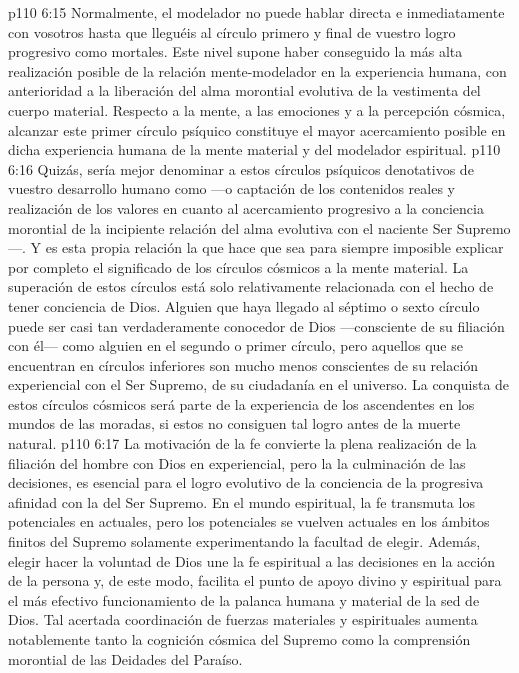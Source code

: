 \vs p110 6:15 \pc {} Normalmente, el modelador no puede hablar directa e inmediatamente con vosotros hasta que lleguéis al círculo primero y final de vuestro logro progresivo como mortales. Este nivel supone haber conseguido la más alta realización posible de la relación mente\hyp{}modelador en la experiencia humana, con anterioridad a la liberación del alma morontial evolutiva de la vestimenta del cuerpo material. Respecto a la mente, a las emociones y a la percepción cósmica, alcanzar este primer círculo psíquico constituye el mayor acercamiento posible en dicha experiencia humana de la mente material y del modelador espiritual.
\vs p110 6:16 \pc Quizás, sería mejor denominar a estos círculos psíquicos denotativos de vuestro desarrollo humano como  ---o captación de los contenidos reales y realización de los valores en cuanto al acercamiento progresivo a la conciencia morontial de la incipiente relación del alma evolutiva con el naciente Ser Supremo---. Y es esta propia relación la que hace que sea para siempre imposible explicar por completo el significado de los círculos cósmicos a la mente material. La superación de estos círculos está solo relativamente relacionada con el hecho de tener conciencia de Dios. Alguien que haya llegado al séptimo o sexto círculo puede ser casi tan verdaderamente conocedor de Dios ---consciente de su filiación con él--- como alguien en el segundo o primer círculo, pero aquellos que se encuentran en círculos inferiores son mucho menos conscientes de su relación experiencial con el Ser Supremo, de su ciudadanía en el universo. La conquista de estos círculos cósmicos será parte de la experiencia de los ascendentes en los mundos de las moradas, si estos no consiguen tal logro antes de la muerte natural.
\vs p110 6:17 La motivación de la fe convierte la plena realización de la filiación del hombre con Dios en experiencial, pero la  la culminación de las decisiones, es esencial para el logro evolutivo de la conciencia de la progresiva afinidad con la  del Ser Supremo. En el mundo espiritual, la fe transmuta los potenciales en actuales, pero los potenciales se vuelven actuales en los ámbitos finitos del Supremo solamente experimentando la facultad de elegir. Además, elegir hacer la voluntad de Dios une la fe espiritual a las decisiones en la acción de la persona y, de este modo, facilita el punto de apoyo divino y espiritual para el más efectivo funcionamiento de la palanca humana y material de la sed de Dios. Tal acertada coordinación de fuerzas materiales y espirituales aumenta notablemente tanto la cognición cósmica del Supremo como la comprensión morontial de las Deidades del Paraíso.
